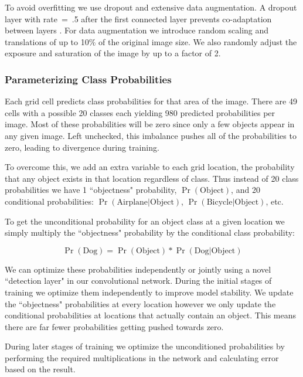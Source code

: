 \documentclass{article} %
\begin{document}
To avoid overfitting we use dropout and extensive data augmentation. A dropout layer with rate~=~.5 after the first connected layer prevents co-adaptation between layers \cite{hinton2012improving}. For data augmentation we introduce random scaling and translations of up to 10\% of the original image size. We also randomly adjust the exposure and saturation of the image by up to a factor of 2.

\subsubsection{Parameterizing Class Probabilities}

Each grid cell predicts class probabilities for that area of the image. There are 49 cells with a possible 20 classes each yielding 980 predicted probabilities per image. Most of these probabilities will be zero since only a few objects appear in any given image. Left unchecked, this imbalance pushes all of the probabilities to zero, leading to divergence during training.

To overcome this, we add an extra variable to each grid location, the probability that any object exists in that location regardless of class. Thus instead of 20 class probabilities we have 1 ``objectness" probability, $\Pr(\textrm{Object})$, and 20 conditional probabilities: $\Pr(\textrm{Airplane} | \textrm{Object})$, $\Pr(\textrm{Bicycle} | \textrm{Object})$, etc.

To get the unconditional probability for an object class at a given location we simply multiply the ``objectness" probability by the conditional class probability:

\begin{equation}
\Pr(\textrm{Dog}) = \Pr(\textrm{Object}) * \Pr(\textrm{Dog} | \textrm{Object})
\end{equation}

We can optimize these probabilities independently or jointly using a novel ``detection layer" in our convolutional network. During the initial stages of training we optimize them independently to improve model stability. We update the ``objectness" probabilities at every location however we only update the conditional probabilities at locations that actually contain an object. This means there are far fewer probabilities getting pushed towards zero. 

During later stages of training we optimize the unconditioned probabilities by performing the required multiplications in the network and calculating error based on the result.
\end{document}
